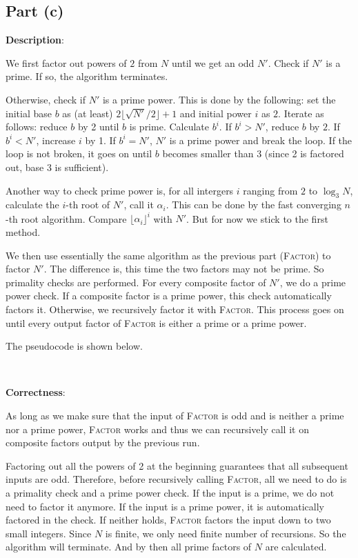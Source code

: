 \documentclass{article}
\begin{document}
\subsection{Part (c)}
\noindent\textbf{Description}:

We first factor out powers of $2$ from $N$ until we get an odd $N'$. Check if $N'$ is a prime. If so, the algorithm terminates.

Otherwise, check if $N'$ is a prime power. This is done by the following: set the initial base $b$ as (at least) $2\lfloor\sqrt{N'}/2\rfloor+1$ and initial power $i$ as $2$. Iterate as follows: reduce $b$ by 2 until $b$ is prime. Calculate $b^i$. If $b^i>N'$, reduce $b$ by $2$. If $b^i<N'$, increase $i$ by 1. If $b^i=N'$, $N'$ is a prime power and break the loop. If the loop is not broken, it goes on until $b$ becomes smaller than 3 (since 2 is factored out, base 3 is sufficient).

Another way to check prime power is, for all intergers $i$ ranging from $2$ to $\log_3N$, calculate the $i$-th root of $N'$, call it $\alpha_i$. This can be done by the fast converging $n$-th root algorithm. Compare $\lfloor\alpha_i\rfloor^i$ with $N'$. But for now we stick to the first method.

We then use essentially the same algorithm as the previous part (\textsc{Factor}) to factor $N'$. The difference is, this time the two factors may not be prime. So primality checks are performed. For every composite factor of $N'$, we do a prime power check. If a composite factor is a prime power, this check automatically factors it. Otherwise, we recursively factor it with \textsc{Factor}. This process goes on until every output factor of \textsc{Factor} is either a prime or a prime power.

The pseudocode is shown below.

~

\noindent\textbf{Correctness}:

As long as we make sure that the input of \textsc{Factor} is odd and is neither a prime nor a prime power, \textsc{Factor} works and thus we can recursively call it on composite factors output by the previous run.

Factoring out all the powers of 2 at the beginning guarantees that all subsequent inputs are odd. Therefore, before recursively calling \textsc{Factor}, all we need to do is a primality check and a prime power check. If the input is a prime, we do not need to factor it anymore. If the input is a prime power, it is automatically factored in the check. If neither holds, \textsc{Factor} factors the input down to two small integers. Since $N$ is finite, we only need finite number of recursions. So the algorithm will terminate. And by then all prime factors of $N$ are calculated.
\end{document}
